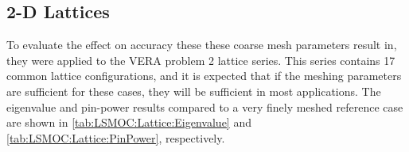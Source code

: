 {{{{        %
      }
    }

    \subsection{2-D Lattices}{\label{ssec:LSMOC:2-D Lattices}
      To evaluate the effect on accuracy these these coarse mesh parameters result in, they were applied to the \ac{VERA} problem 2 lattice series.
      This series contains 17 common lattice configurations, and it is expected that if the meshing parameters are sufficient for these cases, they will be sufficient in most applications.
      The eigenvalue and pin-power results compared to a very finely meshed reference case are shown in \cref{tab:LSMOC:Lattice:Eigenvalue} and \cref{tab:LSMOC:Lattice:PinPower}, respectively.

}}}
